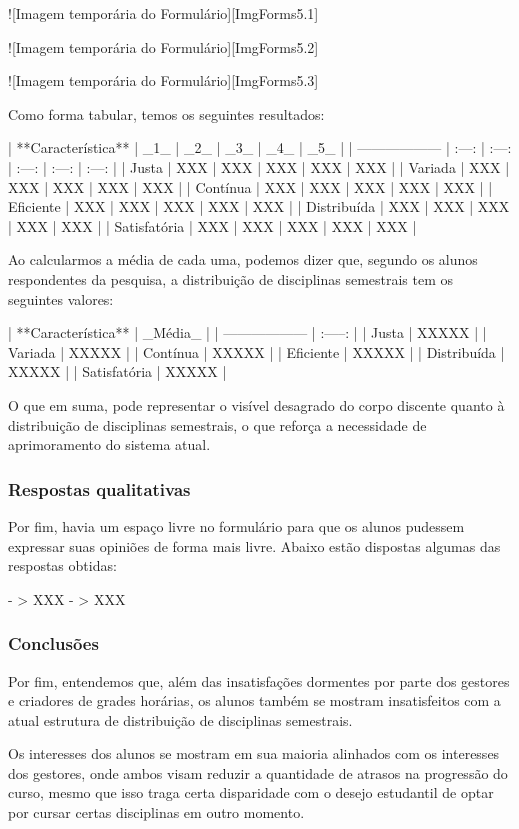         ![Imagem temporária do Formulário][ImgForms5.1]

        ![Imagem temporária do Formulário][ImgForms5.2]

        ![Imagem temporária do Formulário][ImgForms5.3]

        Como forma tabular, temos os seguintes resultados:

        | **Característica** |  _1_  |  _2_  |  _3_  |  _4_  |  _5_  |
        | ------------------ | :---: | :---: | :---: | :---: | :---: |
        | Justa              |  XXX  |  XXX  |  XXX  |  XXX  |  XXX  |
        | Variada            |  XXX  |  XXX  |  XXX  |  XXX  |  XXX  |
        | Contínua           |  XXX  |  XXX  |  XXX  |  XXX  |  XXX  |
        | Eficiente          |  XXX  |  XXX  |  XXX  |  XXX  |  XXX  |
        | Distribuída        |  XXX  |  XXX  |  XXX  |  XXX  |  XXX  |
        | Satisfatória       |  XXX  |  XXX  |  XXX  |  XXX  |  XXX  |

        Ao calcularmos a média de cada uma, podemos dizer que, segundo os alunos respondentes da pesquisa, a distribuição de disciplinas semestrais tem os seguintes valores:

        | **Característica** | _Média_ |
        | ------------------ | :-----: |
        | Justa              |  XXXXX  |
        | Variada            |  XXXXX  |
        | Contínua           |  XXXXX  |
        | Eficiente          |  XXXXX  |
        | Distribuída        |  XXXXX  |
        | Satisfatória       |  XXXXX  |

        O que em suma, pode representar o visível desagrado do corpo discente quanto à distribuição de disciplinas semestrais, o que reforça a necessidade de aprimoramento do sistema atual.

        \subsubsection{Respostas qualitativas} %

            Por fim, havia um espaço livre no formulário para que os alunos pudessem expressar suas opiniões de forma mais livre. Abaixo estão dispostas algumas das respostas obtidas:

            - > XXX
            - > XXX

    \subsubsection{Conclusões} %

        Por fim, entendemos que, além das insatisfações dormentes por parte dos gestores e criadores de grades horárias, os alunos também se mostram insatisfeitos com a atual estrutura de distribuição de disciplinas semestrais.

        Os interesses dos alunos se mostram em sua maioria alinhados com os interesses dos gestores, onde ambos visam reduzir a quantidade de atrasos na progressão do curso, mesmo que isso traga certa disparidade com o desejo estudantil de optar por cursar certas disciplinas em outro momento.
